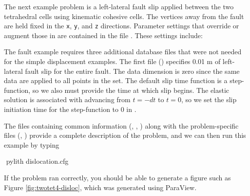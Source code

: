 The next example problem is a left-lateral fault slip applied between
the two tetrahedral cells using kinematic cohesive cells. The vertices
away from the fault are held fixed in the \texttt{x}, \texttt{y},
and \texttt{z} directions. Parameter settings that override or augment
those in  are contained in the file .
These settings include:
\begin{inventory}
\end{inventory}
The fault example requires three additional database files that were
not needed for the simple displacement examples. The first file
() specifies 0.01 m of
left-lateral fault slip for the entire fault.  The data dimension is
zero since the same data are applied to all points in the set. The
default slip time function is a step-function, so we also must provide
the time at which slip begins. The elastic solution is associated with
advancing from $t=-dt$ to $t=0$, so we set the slip initiation time
for the step-function to 0 in
.

The files containing common information (, ,
) along with the problem-specific files
(,
) provide a complete description
of the problem, and we can then run this example by typing
\begin{shell}
$$ pylith dislocation.cfg
\end{shell}
If the problem ran correctly, you should be able to generate a figure
such as Figure \vref{fig:twotet4-disloc}, which was generated using
ParaView.

